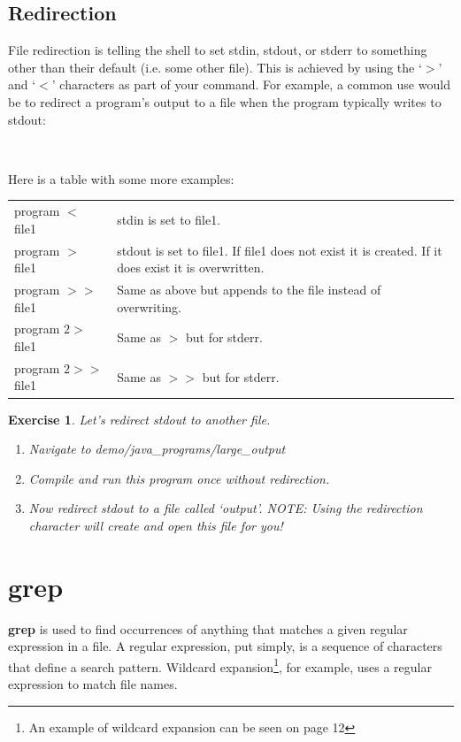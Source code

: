 \documentclass[oneside]{book}
\newcommand{\commandline}[1]{\begin{center} \colorbox{Dark}{\textcolor{white}{#1}} \end{center}}
\newtheorem{ex}{Exercise}[chapter]
\begin{document}
    \subsection{Redirection}
        File redirection is telling the shell to set stdin, stdout, or stderr to something other than their default (i.e. some other file). This is achieved by using the `$>$' and `$<$' characters as part of your command. For example, a common use would be to redirect a program's output to a file when the program typically writes to stdout:
        \commandline{java HelloWold.java $>$ output.txt}
        \vspace{0.3cm}
        Here is a table with some more examples:
        \begin{center}
            \begin{tabular}{|l|l|}
                 \hline
                 program $<$ file1 & stdin is set to file1. \\
                 program $>$ file1 & stdout is set to file1. If file1 does not exist it is created. If it does exist it is overwritten. \\
                 program $>>$ file1 & Same as above but appends to the file instead of overwriting. \\
                 program $2>$ file1 & Same as $>$ but for stderr. \\
                 program $2>>$ file1 & Same as $>>$ but for stderr. \\ \hline
            \end{tabular}
        \end{center}
        
        \vspace{0.5cm}

    \begin{ex} Let's redirect stdout to another file.
        \begin{enumerate}
            \item Navigate to demo/java\_programs/large\_output
            \item Compile and run this program once without redirection.
            \item Now redirect stdout to a file called `output'. NOTE: Using the redirection character will create and open this file for you!
        \end{enumerate}
    \end{ex}

\section{grep}
\textbf{grep} is used to find occurrences of anything that matches a given regular expression in a file. A regular expression, put simply, is a sequence of characters that define a search pattern. Wildcard expansion\footnote{An example of wildcard expansion can be seen on page 12}, for example, uses a regular expression to match file names.
\end{document}
